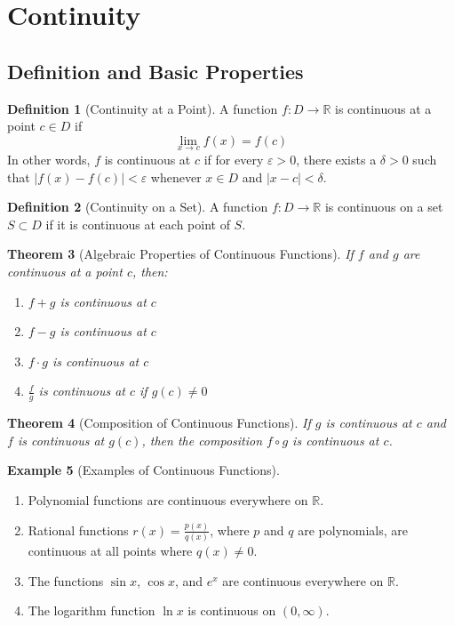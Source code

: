 \documentclass[12pt,a4paper]{article}
\theoremstyle{plain}
\newtheorem{theorem}{Theorem}[section]
\theoremstyle{definition}
\newtheorem{definition}[theorem]{Definition}
\newtheorem{example}[theorem]{Example}
\begin{document}
\section{Continuity}

\subsection{Definition and Basic Properties}

\begin{definition}[Continuity at a Point]
A function $f: D \to \mathbb{R}$ is continuous at a point $c \in D$ if
\begin{equation}
\lim_{x \to c} f(x) = f(c)
\end{equation}
In other words, $f$ is continuous at $c$ if for every $\varepsilon > 0$, there exists a $\delta > 0$ such that $|f(x) - f(c)| < \varepsilon$ whenever $x \in D$ and $|x - c| < \delta$.
\end{definition}

\begin{definition}[Continuity on a Set]
A function $f: D \to \mathbb{R}$ is continuous on a set $S \subset D$ if it is continuous at each point of $S$.
\end{definition}

\begin{theorem}[Algebraic Properties of Continuous Functions]
If $f$ and $g$ are continuous at a point $c$, then:
\begin{enumerate}[label=(\roman*)]
\item $f + g$ is continuous at $c$
\item $f - g$ is continuous at $c$
\item $f \cdot g$ is continuous at $c$
\item $\frac{f}{g}$ is continuous at $c$ if $g(c) \neq 0$
\end{enumerate}
\end{theorem}

\begin{theorem}[Composition of Continuous Functions]
If $g$ is continuous at $c$ and $f$ is continuous at $g(c)$, then the composition $f \circ g$ is continuous at $c$.
\end{theorem}

\begin{example}[Examples of Continuous Functions]
\begin{enumerate}[label=(\alph*)]
\item Polynomial functions are continuous everywhere on $\mathbb{R}$.
\item Rational functions $r(x) = \frac{p(x)}{q(x)}$, where $p$ and $q$ are polynomials, are continuous at all points where $q(x) \neq 0$.
\item The functions $\sin x$, $\cos x$, and $e^x$ are continuous everywhere on $\mathbb{R}$.
\item The logarithm function $\ln x$ is continuous on $(0, \infty)$.
\end{enumerate}
\end{example}
\end{document}
